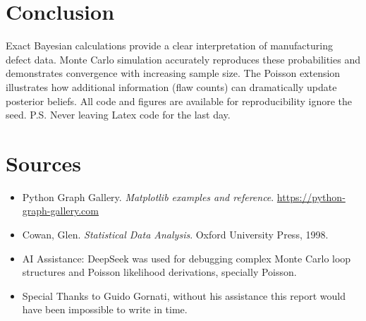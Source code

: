 \documentclass[11pt]{article}
\begin{document}
	\section{Conclusion}
	Exact Bayesian calculations provide a clear interpretation of manufacturing defect data. Monte Carlo simulation accurately reproduces these probabilities and demonstrates convergence with increasing sample size. The Poisson extension illustrates how additional information (flaw counts) can dramatically update posterior beliefs. All code and figures are available for reproducibility ignore the seed.
	P.S. Never leaving Latex code for the last day.
	
	
	\section*{Sources}
	\begin{itemize}
		\item Python Graph Gallery. \textit{Matplotlib examples and reference}. \url{https://python-graph-gallery.com}
		\item Cowan, Glen. \textit{Statistical Data Analysis}. Oxford University Press, 1998.
		\item AI Assistance: DeepSeek was used for debugging complex Monte Carlo loop structures and Poisson likelihood derivations, specially Poisson.
		\item Special Thanks to Guido Gornati, without his assistance this report would have been impossible to write in time.
	\end{itemize}
\end{document}
